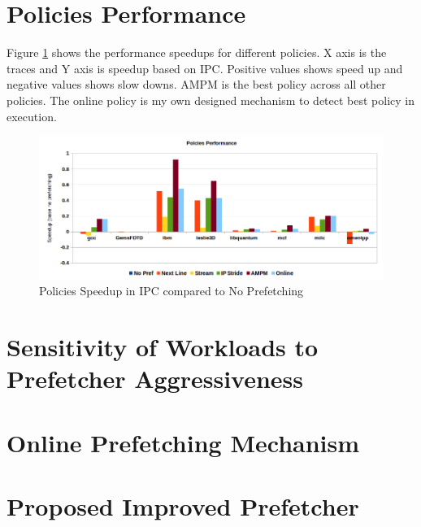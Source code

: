 \documentclass{article}
\begin{document}
\section{Policies Performance}
Figure \ref{pic:perf} shows the performance speedups for different policies. X axis is the traces and Y axis is speedup based on IPC. Positive values shows speed up and negative values shows slow downs. AMPM is the best policy across all other policies. The online policy is my own designed mechanism to detect best policy in execution. 

\begin{figure}[h!]
  \label{pic:perf}
  \centering
    \includegraphics[width=1\textwidth]{perf.png}
    \caption{Policies Speedup in IPC compared to No Prefetching}
\end{figure}

\section{Sensitivity of Workloads to Prefetcher Aggressiveness}


\section{Online Prefetching Mechanism}

\section{Proposed Improved Prefetcher}

% 
% 
% 
\end{document}
